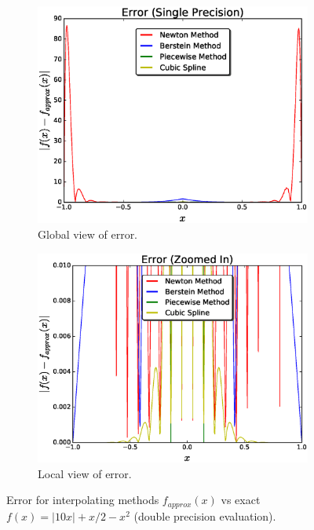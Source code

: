 \documentclass[12pt]{article}
\theoremstyle{remark}
\begin{document}
\begin{figure}[H]
	\centering
	\begin{subfigure}{.5\textwidth}
		\centering
		\includegraphics[width=1.1\linewidth]{errorFig2.eps}
		\caption{Global view of error.}
		\label{fig:sub1}
	\end{subfigure}%
	\begin{subfigure}{.5\textwidth}
		\centering
		\includegraphics[width=1.1\linewidth]{errorFigg2.eps}
		\caption{Local view of error.}
		\label{fig:sub2}
	\end{subfigure}
	\caption{Error for interpolating methods $f_{approx}(x)$ vs exact $f(x) = \vert 10x \vert + x/2 - x^2$ (double precision evaluation). }
	\label{fig:test}
\end{figure}
\end{document}
